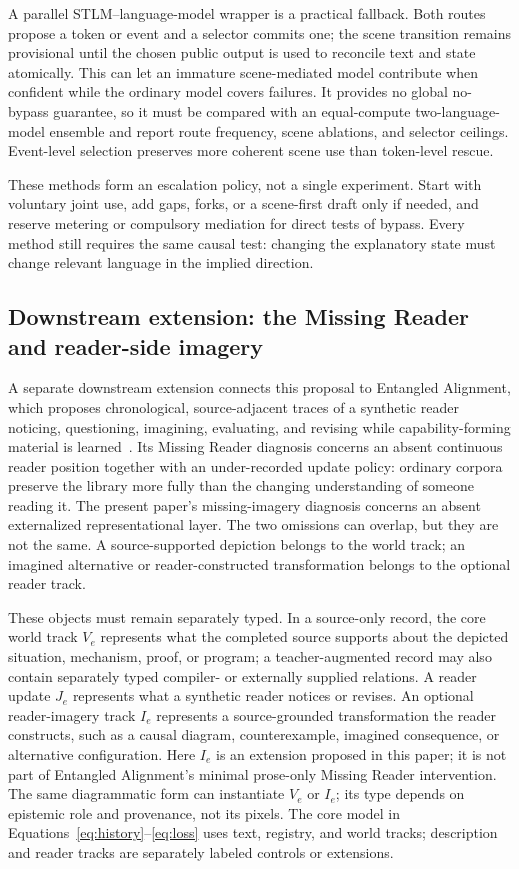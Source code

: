 \documentclass[11pt]{article}
\begin{document}
A parallel STLM--language-model wrapper is a practical fallback. Both routes propose a token or event and a selector commits one; the scene transition remains provisional until the chosen public output is used to reconcile text and state atomically. This can let an immature scene-mediated model contribute when confident while the ordinary model covers failures. It provides no global no-bypass guarantee, so it must be compared with an equal-compute two-language-model ensemble and report route frequency, scene ablations, and selector ceilings. Event-level selection preserves more coherent scene use than token-level rescue.

These methods form an escalation policy, not a single experiment. Start with voluntary joint use, add gaps, forks, or a scene-first draft only if needed, and reserve metering or compulsory mediation for direct tests of bypass. Every method still requires the same causal test: changing the explanatory state must change relevant language in the implied direction.

\subsection{Downstream extension: the Missing Reader and reader-side imagery}
\label{sec:reader-track}

A separate downstream extension connects this proposal to Entangled Alignment, which proposes chronological, source-adjacent traces of a synthetic reader noticing, questioning, imagining, evaluating, and revising while capability-forming material is learned~\cite{westerberg2026entangled}. Its Missing Reader diagnosis concerns an absent continuous reader position together with an under-recorded update policy: ordinary corpora preserve the library more fully than the changing understanding of someone reading it. The present paper's missing-imagery diagnosis concerns an absent externalized representational layer. The two omissions can overlap, but they are not the same. A source-supported depiction belongs to the world track; an imagined alternative or reader-constructed transformation belongs to the optional reader track.

These objects must remain separately typed. In a source-only record, the core world track $V_e$ represents what the completed source supports about the depicted situation, mechanism, proof, or program; a teacher-augmented record may also contain separately typed compiler- or externally supplied relations. A reader update $J_e$ represents what a synthetic reader notices or revises. An optional reader-imagery track $I_e$ represents a source-grounded transformation the reader constructs, such as a causal diagram, counterexample, imagined consequence, or alternative configuration. Here $I_e$ is an extension proposed in this paper; it is not part of Entangled Alignment's minimal prose-only Missing Reader intervention. The same diagrammatic form can instantiate $V_e$ or $I_e$; its type depends on epistemic role and provenance, not its pixels. The core model in Equations~\ref{eq:history}--\ref{eq:loss} uses text, registry, and world tracks; description and reader tracks are separately labeled controls or extensions.
\end{document}
